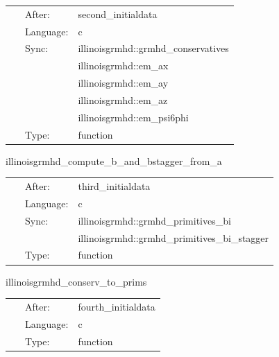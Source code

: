 \documentclass{article}
\begin{document}
\hspace{5mm}

 \begin{tabular*}{160mm}{cll} 
~ & After:  & second\_initialdata \\ 
~ & Language:  & c \\ 
~ & Sync:  & illinoisgrmhd::grmhd\_conservatives \\ 
~& ~ &illinoisgrmhd::em\_ax\\ 
~& ~ &illinoisgrmhd::em\_ay\\ 
~& ~ &illinoisgrmhd::em\_az\\ 
~& ~ &illinoisgrmhd::em\_psi6phi\\ 
~ & Type:  & function \\ 
\end{tabular*} 


\vspace{5mm}


\hspace{5mm} illinoisgrmhd\_compute\_b\_and\_bstagger\_from\_a 

\hspace{5mm}{\it compute b and b\_stagger from a } 


\hspace{5mm}

 \begin{tabular*}{160mm}{cll} 
~ & After:  & third\_initialdata \\ 
~ & Language:  & c \\ 
~ & Sync:  & illinoisgrmhd::grmhd\_primitives\_bi \\ 
~& ~ &illinoisgrmhd::grmhd\_primitives\_bi\_stagger\\ 
~ & Type:  & function \\ 
\end{tabular*} 


\vspace{5mm}


\hspace{5mm} illinoisgrmhd\_conserv\_to\_prims 

\hspace{5mm}{\it compute primitive variables from conservatives. this is non-trivial, requiring a newton-raphson root-finder. } 


\hspace{5mm}

 \begin{tabular*}{160mm}{cll} 
~ & After:  & fourth\_initialdata \\ 
~ & Language:  & c \\ 
~ & Type:  & function \\ 
\end{tabular*} 
\end{document}
